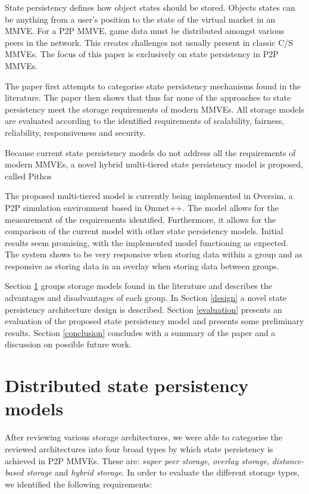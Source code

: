\documentclass[10pt,a4paper,conference]{IEEEtran}
\begin{document}
State persistency defines how object states should be stored. Objects states can be anything from a user's position to the state of the virtual
market in an MMVE. For a P2P MMVE, game data must be distributed amongst various peers in the network. This creates challenges not usually present in
classic C/S MMVEs. The focus of this paper is exclusively on state persistency in P2P MMVEs.

The paper first attempts to categorise state persistency mechanisms found in the literature. The paper then shows that thus far none of the
approaches to state persistency meet the storage requirements of modern MMVEs. All storage models are evaluated according to the identified
requirements of scalability, fairness, reliability, responsiveness and security.

Because current state persistency models do not address all the requirements of modern MMVEs, a novel hybrid multi-tiered state persistency model is
proposed, called Pithos

The proposed multi-tiered model is currently being implemented in Oversim, a P2P simulation environment based in Omnet++. The model allows for the
measurement of the requirements identified. Furthermore, it allows for the comparison of the current model with other state persistency models.
Initial results seem promising, with the implemented model functioning as expected. The system shows to be very responsive when storing data within a
group and as responsive as storing data in an overlay when storing data between groups.

Section \ref{current_models} groups storage models found in the literature and describes the advantages and disadvantages of each group.
%
In Section \ref{design} a novel state persistency architecture design is described.
%
Section \ref{evaluation} presents an evaluation of the proposed state persistency model and presents some preliminary results.
%
Section \ref{conclusion} concludes with a summary of the paper and a discussion on possible future work.

\section{Distributed state persistency models}
\label{current_models}

After reviewing various storage architectures, we were able to categorise the reviewed architectures into four broad types by which state persistency
is achieved in P2P MMVEs. These are: \emph{super peer storage}, \emph{overlay storage}, \emph{distance-based storage} and \emph{hybrid storage}. In
order to evaluate the different storage types, we identified the following requirements:
\end{document}

